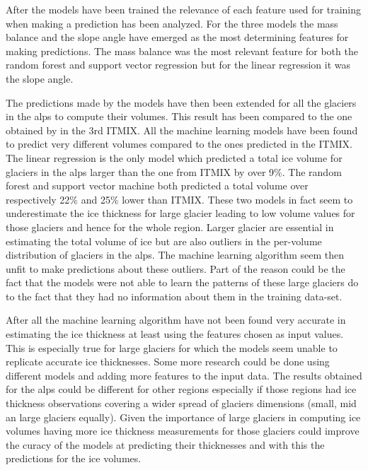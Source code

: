After the models have been trained the relevance of each feature used for training when making a prediction has been analyzed. For the three models the mass balance and the slope angle have emerged as the most determining features for making predictions. The mass balance was the most relevant feature for both the random forest and support vector regression but for the linear regression it was the slope angle.

The predictions made by the models have then been extended for all the glaciers in the alps to compute their volumes. This result has been compared to the one obtained by \citet{Farinotti2019} in the 3rd ITMIX. All the machine learning models have been found to predict very different volumes compared to the ones predicted in the ITMIX. The linear regression is the only model which predicted a total ice volume for glaciers in the alps larger than the one from ITMIX by over 9\%. The random forest and support vector machine both predicted a total volume over respectively 22\% and 25\% lower than ITMIX. These two models in fact seem to underestimate the ice thickness for large glacier leading to low volume values for those glaciers and hence for the whole region. Larger glacier are essential in estimating the total volume of ice but are also outliers in the per-volume distribution of glaciers in the alps. The machine learning algorithm seem then unfit to make predictions about these outliers. Part of the reason could be the fact that the models were not able to learn the patterns of these large glaciers do to the fact that they had no information about them in the training data-set. 

After all the machine learning algorithm have not been found very accurate in estimating the ice thickness at least using the features chosen as input values. This is especially true for large glaciers for which the models seem unable to replicate accurate ice thicknesses.
Some more research could be done using different models and adding more features to the input data.
The results obtained for the alps could be different for other regions especially if those regions had ice thickness observations covering a wider spread of glaciers dimensions (small, mid an large glaciers equally).
Given the importance of large glaciers in computing ice volumes having more ice thickness measurements for those glaciers could improve the curacy of the models at predicting their thicknesses and with this the predictions for the ice volumes.
